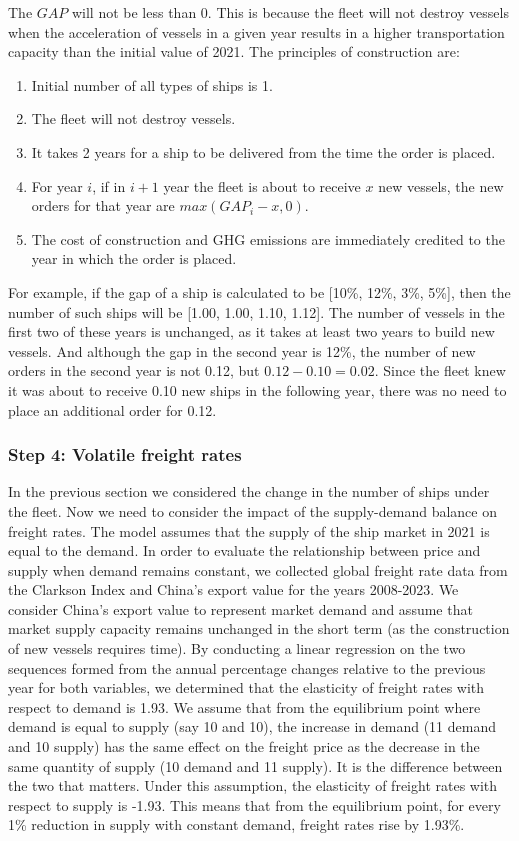 \documentclass[a4paper,12pt]{article}
\begin{document}
The $GAP$ will not be less than 0.
This is because the fleet will not destroy vessels when the acceleration of vessels in a given year results in a higher transportation capacity than the initial value of 2021.
The principles of construction are:
\begin{enumerate}
	\item Initial number of all types of ships is 1.
	\item The fleet will not destroy vessels.
	\item It takes 2 years for a ship to be delivered from the time the order is placed.
	\item For year $i$, if in $i+1$ year the fleet is about to receive $x$ new vessels, the new orders for that year are $max(GAP_i - x, 0)$.
	\item The cost of construction and GHG emissions are immediately credited to the year in which the order is placed.
\end{enumerate}


For example, if the gap of a ship is calculated to be [10\%, 12\%, 3\%, 5\%], then the number of such ships will be [1.00, 1.00, 1.10, 1.12].
The number of vessels in the first two of these years is unchanged, as it takes at least two years to build new vessels.
And although the gap in the second year is 12\%, the number of new orders in the second year is not 0.12, but $0.12-0.10=0.02$.
Since the fleet knew it was about to receive 0.10 new ships in the following year, there was no need to place an additional order for 0.12.

\subsubsection*{Step 4: Volatile freight rates}
In the previous section we considered the change in the number of ships under the fleet.
Now we need to consider the impact of the supply-demand balance on freight rates.
The model assumes that the supply of the ship market in 2021 is equal to the demand.
In order to evaluate the relationship between price and supply when demand remains constant, we collected global freight rate data from the Clarkson Index and China's export value for the years 2008-2023.
We consider China's export value to represent market demand and assume that market supply capacity remains unchanged in the short term (as the construction of new vessels requires time).
By conducting a linear regression on the two sequences formed from the annual percentage changes relative to the previous year for both variables, we determined that the elasticity of freight rates with respect to demand is 1.93.
We assume that from the equilibrium point where demand is equal to supply (say 10 and 10), the increase in demand (11 demand and 10 supply) has the same effect on the freight price as the decrease in the same quantity of supply (10 demand and 11 supply).  
It is the difference between the two that matters.
Under this assumption, the elasticity of freight rates with respect to supply is -1.93.
This means that from the equilibrium point, for every 1\% reduction in supply with constant demand, freight rates rise by 1.93\%.\\
\end{document}
